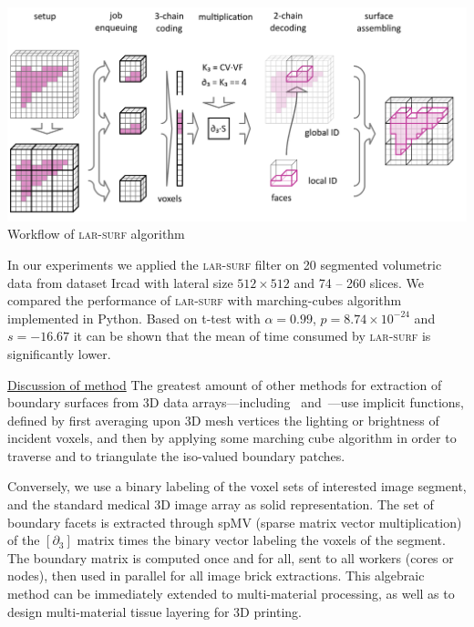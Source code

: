 \documentclass{article}
\begin{document}
\noindent
\begin{minipage}{0.6\textwidth}
\centering
\includegraphics[width=\textwidth]{figs/schema_horizontal.png} 
{Workflow of \textsc{lar-surf} algorithm}
\label{fig:schema}
\end{minipage}
\begin{minipage}{0.4\textwidth}\small\flushright
In our experiments we applied the \textsc{lar-surf} filter on 20 segmented volumetric data from dataset Ircad \cite{ircad} with lateral size $512\times512$ and 74 -- 260 slices. We compared the performance of \textsc{lar-surf} with marching-cubes algorithm implemented in Python.
Based on t-test with $\alpha=0.99$, $p=8.74\times10^{-24}$ and 
$s=-16.67$ it can be shown that the mean of time consumed by \textsc{lar-surf} is significantly lower.
\end{minipage}




\vspace{0.8em}
\noindent\underline{Discussion of method}\vspace{0.2em}\newline
The greatest amount of other methods for extraction of boundary surfaces from 3D data arrays---including~\cite{10.1016/j.cad.2006.09.003} and~\cite{10.1115/1.2960489}---use implicit functions, defined by first averaging upon 3D mesh vertices the lighting or brightness of incident voxels, and then by applying some marching cube algorithm in order to traverse and to triangulate  the iso-valued boundary patches.  

Conversely, we use a binary labeling of the voxel sets of interested image segment, and the standard medical 3D image array as solid representation. The set of boundary facets is extracted through spMV (sparse matrix vector multiplication) of the $[\partial_3]$ matrix times the binary vector labeling the voxels of the segment. The boundary matrix is computed once and for all, sent to all workers (cores or nodes), then used in parallel for all image brick extractions. This algebraic method can be immediately extended to multi-material processing, as well as to design multi-material tissue layering for 3D printing.
\end{document}
